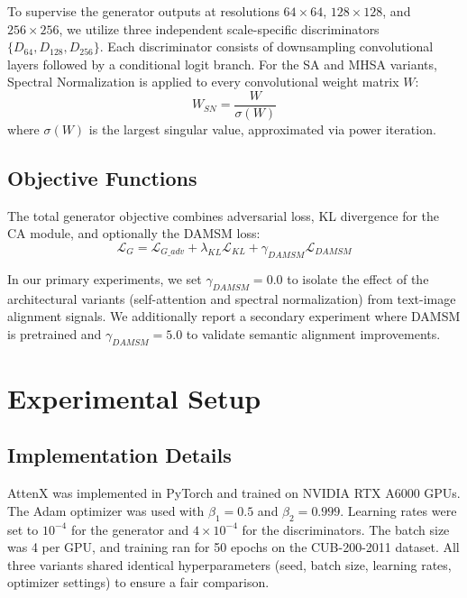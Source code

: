 \documentclass[conference]{IEEEtran}
\begin{document}
To supervise the generator outputs at resolutions $64 \times 64$, $128 \times 128$, and $256 \times 256$, we utilize three independent scale-specific discriminators $\{D_{64}, D_{128}, D_{256}\}$. Each discriminator consists of downsampling convolutional layers followed by a conditional logit branch. For the SA and MHSA variants, Spectral Normalization \cite{miyato2018spectral} is applied to every convolutional weight matrix $W$:
\begin{equation}
    W_{SN} = \frac{W}{\sigma(W)}
\end{equation}
where $\sigma(W)$ is the largest singular value, approximated via power iteration.

\subsection{Objective Functions}

The total generator objective combines adversarial loss, KL divergence for the CA module, and optionally the DAMSM loss:
\begin{equation}
    \mathcal{L}_{G} = \mathcal{L}_{G\_adv} + \lambda_{KL} \mathcal{L}_{KL} + \gamma_{DAMSM} \mathcal{L}_{DAMSM}
\end{equation}

In our primary experiments, we set $\gamma_{DAMSM} = 0.0$ to isolate the effect of the architectural variants (self-attention and spectral normalization) from text-image alignment signals. We additionally report a secondary experiment where DAMSM is pretrained and $\gamma_{DAMSM} = 5.0$ to validate semantic alignment improvements.

\section{Experimental Setup}

\subsection{Implementation Details}

AttenX was implemented in PyTorch and trained on NVIDIA RTX A6000 GPUs. The Adam optimizer was used with $\beta_1 = 0.5$ and $\beta_2 = 0.999$. Learning rates were set to $10^{-4}$ for the generator and $4 \times 10^{-4}$ for the discriminators. The batch size was 4 per GPU, and training ran for 50 epochs on the CUB-200-2011 dataset. All three variants shared identical hyperparameters (seed, batch size, learning rates, optimizer settings) to ensure a fair comparison.
\end{document}
